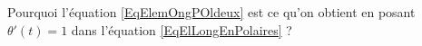 \begin{exercice}\label{exoGeomAnal-0004}

	Pourquoi l'équation \eqref{EqElemOngPOldeux} est ce qu'on obtient en posant $\theta'(t)=1$ dans l'équation \eqref{EqElLongEnPolaires} ?

\end{exercice}
